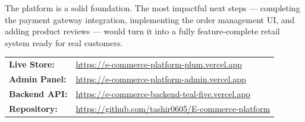 \documentclass[12pt,a4paper]{report}
\begin{document}
The platform is a solid foundation.
The most impactful next steps — completing the payment gateway integration, implementing the order
management UI, and adding product reviews — would turn it into a fully feature-complete retail system
ready for real customers.

\vspace{1cm}
\begin{tcolorbox}[colback=blue!5, colframe=blue!60!black, title=Quick Reference]
  \begin{tabular}{ll}
    \textbf{Live Store:}     & \url{https://e-commerce-platform-plum.vercel.app} \\
    \textbf{Admin Panel:}    & \url{https://e-commerce-platform-admin.vercel.app} \\
    \textbf{Backend API:}    & \url{https://e-commerce-backend-teal-five.vercel.app} \\
    \textbf{Repository:}     & \url{https://github.com/tashir0605/E-commerce-platform} \\
  \end{tabular}
\end{tcolorbox}

\end{document}
